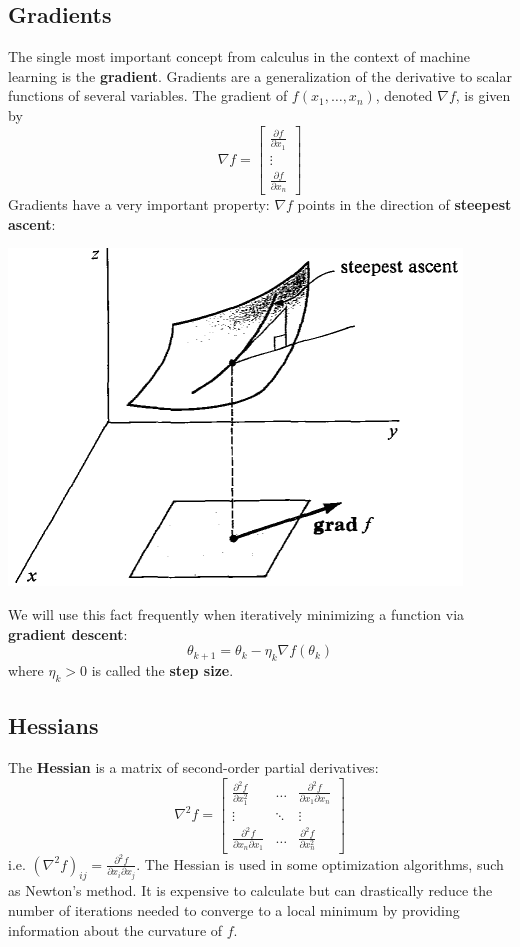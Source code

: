 \documentclass{article}
\newcommand{\kwoo}[2]{\frac{\partial #1}{\partial #2}}
\newcommand{\kwoosq}[2]{\frac{\partial^2 #1}{\partial #2^2}}
\newcommand{\kwootwo}[3]{\frac{\partial^2 #1}{\partial #2 \partial #3}}
\newcommand{\mat}[1]{\begin{bmatrix}#1\end{bmatrix}}
\newcommand{\term}[1]{\textbf{#1}}
\begin{document}
\subsection{Gradients}
The single most important concept from calculus in the context of machine learning is the \term{gradient}. Gradients are a generalization of the derivative to scalar functions of several variables. The gradient of $f(x_1, \dots, x_n)$, denoted $\nabla f$, is given by
\[\nabla f = \mat{\kwoo{f}{x_1} \\ \vdots \\ \kwoo{f}{x_n}}\]
Gradients have a very important property: $\nabla f$ points in the direction of \term{steepest ascent}:
\begin{center}
\includegraphics[width=0.9\linewidth]{gradient.png}
\end{center}
We will use this fact frequently when iteratively minimizing a function via \term{gradient descent}:
\[\theta_{k+1} = \theta_k - \eta_k \nabla f(\theta_k)\]
where $\eta_k > 0$ is called the \term{step size}.

\subsection{Hessians}
The \term{Hessian} is a matrix of second-order partial derivatives:
\[\nabla^2 f = \mat{
	\kwoosq{f}{x_1} & \hdots & \kwootwo{f}{x_1}{x_n} \\
	\vdots & \ddots & \vdots \\
	\kwootwo{f}{x_n}{x_1} & \hdots & \kwoosq{f}{x_n}
}\]
i.e. $(\nabla^2 f)_{ij} = \kwootwo{f}{x_i}{x_j}$. The Hessian is used in some optimization algorithms, such as Newton's method. It is expensive to calculate but can drastically reduce the number of iterations needed to converge to a local minimum by providing information about the curvature of $f$.
\end{document}
